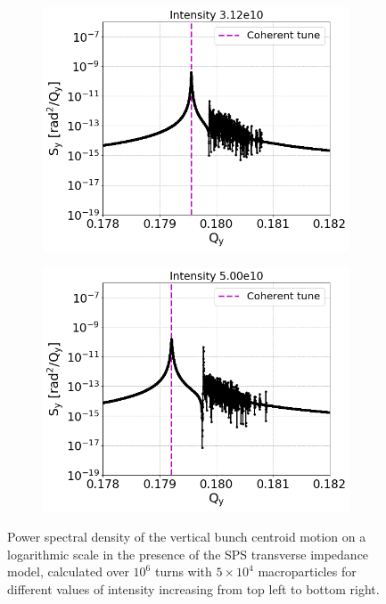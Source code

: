 \begin{figure}[htp]
\begin{subfigure}{.45\textwidth}
        \centering
        \includegraphics[width=.95\linewidth]{images/Ch7/psdY_intensity3.12e10.png}  
        \label{fig:study_9e}
    \end{subfigure}
    \begin{subfigure}{.45\textwidth}
            \centering
            \includegraphics[width=.95\linewidth]{images/Ch7/psdY_intensity5.00e10.png}  
            \label{fig:study_9f}
    \end{subfigure}
    \caption{Power spectral density of the vertical bunch centroid motion on a logarithmic scale in the presence of the SPS transverse impedance model, calculated over $10^6$ turns with $5 \times 10^4$ macroparticles for different values of intensity increasing from top left to bottom right.}
    \label{fig:study_9_schottky_noise_intnensity_scan}
\end{figure}

